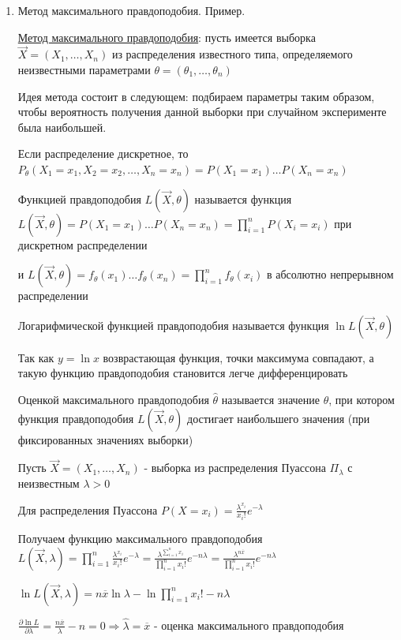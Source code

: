 \begin{enumerate}
    \item Метод максимального правдоподобия. Пример.

    \hyperlink{maximum_likelihood_estimation}{Метод максимального правдоподобия}: пусть имеется выборка $\vec{X} = (X_1, \dots, X_n)$ из распределения известного типа, определяемого неизвестными параметрами 
    $\theta = (\theta_1, \dots, \theta_n)$

    Идея метода состоит в следующем: подбираем параметры таким образом, чтобы вероятность получения
    данной выборки при случайном эксперименте была наибольшей.

    Если распределение дискретное, то $P_{\theta} (X_1 = x_1, X_2 = x_2, \dots, X_n = x_n) = P(X_1 = x_1) \dots P(X_n = x_n)$

    \Defs Функцией правдоподобия $L(\vec{X}, \theta)$ называется функция $L(\vec{X}, \theta) = P(X_1 = x_1) \dots P(X_n = x_n) = \prod_{i = 1}^n P(X_i = x_i)$ при дискретном распределении

    и $L(\vec{X}, \theta) = f_\theta(x_1) \dots f_\theta(x_n) = \prod_{i = 1}^n f_\theta(x_i)$ в абсолютно непрерывном распределении

    \Defs Логарифмической функцией правдоподобия называется функция $\ln L(\vec{X}, \theta)$

    \Notas Так как $y = \ln x$ возврастающая функция, точки максимума совпадают, а такую функцию правдоподобия становится легче дифференцировать

    \Defs Оценкой максимального правдоподобия $\hat{\theta}$ называется значение $\theta$, при котором функция правдоподобия 
    $L(\vec{X}, \theta)$ достигает наибольшего значения (при фиксированных значениях выборки)

    \Ex Пусть $\vec{X} = (X_1, \dots, X_n)$ - выборка из распределения Пуассона $\Pi_\lambda$ с неизвестным $\lambda > 0$

    \Mems Для распределения Пуассона $P(X = x_i) = \frac{\lambda^{x_i}}{x_i!} e^{-\lambda}$
    
    Получаем функцию максимального правдоподобия $L(\vec{X}, \lambda) = \prod_{i = 1}^n \frac{\lambda^{x_i}}{x_i!} e^{-\lambda} = 
    \frac{\lambda^{\sum_{i = 1}^n x_i}}{\prod_{i = 1}^n x_i!} e^{-n\lambda} = \frac{\lambda^{n \overline{x}}}{\prod_{i = 1}^n x_i!} e^{-n\lambda}$
    
    $\ln L(\vec{X}, \lambda) = n \overline{x} \ln \lambda - \ln \prod_{i = 1}^n x_i! - n\lambda$
    
    $\frac{\partial \ln L}{\partial \lambda} = \frac{n \overline{x}}{\lambda} - n = 0 \Longrightarrow \hat{\lambda} = \overline{x}$ - оценка максимального правдоподобия
    

\end{enumerate}
